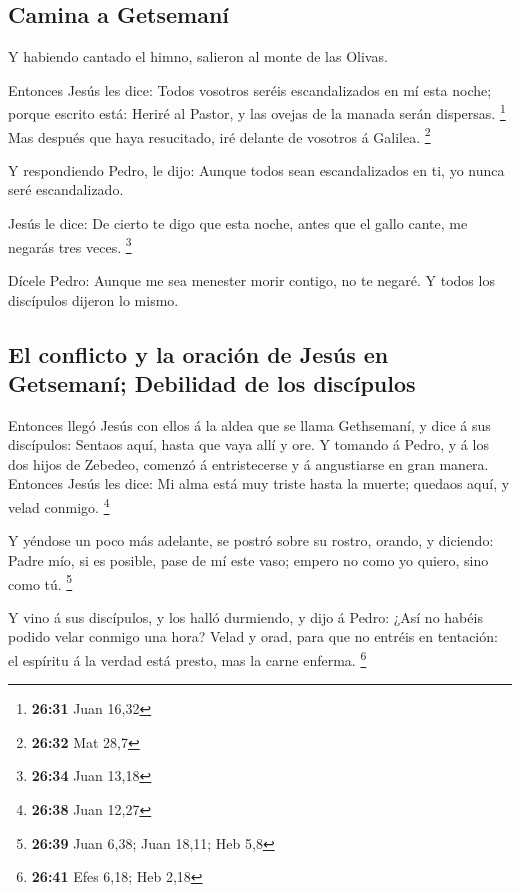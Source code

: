 \hypertarget{camina-a-getsemanuxed}{%
\subsection{Camina a Getsemaní}\label{camina-a-getsemanuxed}}

 Y habiendo cantado el himno, salieron al monte de las
Olivas.

 Entonces Jesús les dice: Todos vosotros seréis
escandalizados en mí esta noche; porque escrito está: Heriré al Pastor,
y las ovejas de la manada serán dispersas. \footnote{\textbf{26:31} Juan
  16,32}  Mas después que haya resucitado, iré delante de
vosotros á Galilea. \footnote{\textbf{26:32} Mat 28,7}

 Y respondiendo Pedro, le dijo: Aunque todos sean
escandalizados en ti, yo nunca seré escandalizado.

 Jesús le dice: De cierto te digo que esta noche, antes
que el gallo cante, me negarás tres veces. \footnote{\textbf{26:34} Juan
  13,18}

 Dícele Pedro: Aunque me sea menester morir contigo, no
te negaré. Y todos los discípulos dijeron lo mismo.

\hypertarget{el-conflicto-y-la-oraciuxf3n-de-jesuxfas-en-getsemanuxed-debilidad-de-los-discuxedpulos}{%
\subsection{El conflicto y la oración de Jesús en Getsemaní; Debilidad
de los
discípulos}\label{el-conflicto-y-la-oraciuxf3n-de-jesuxfas-en-getsemanuxed-debilidad-de-los-discuxedpulos}}

 Entonces llegó Jesús con ellos á la aldea que se llama
Gethsemaní, y dice á sus discípulos: Sentaos aquí, hasta que vaya allí y
ore.  Y tomando á Pedro, y á los dos hijos de Zebedeo,
comenzó á entristecerse y á angustiarse en gran manera. 
Entonces Jesús les dice: Mi alma está muy triste hasta la muerte;
quedaos aquí, y velad conmigo. \footnote{\textbf{26:38} Juan 12,27}

 Y yéndose un poco más adelante, se postró sobre su
rostro, orando, y diciendo: Padre mío, si es posible, pase de mí este
vaso; empero no como yo quiero, sino como tú. \footnote{\textbf{26:39}
  Juan 6,38; Juan 18,11; Heb 5,8}

 Y vino á sus discípulos, y los halló durmiendo, y dijo á
Pedro: ¿Así no habéis podido velar conmigo una hora? 
Velad y orad, para que no entréis en tentación: el espíritu á la verdad
está presto, mas la carne enferma. \footnote{\textbf{26:41} Efes 6,18;
  Heb 2,18}

